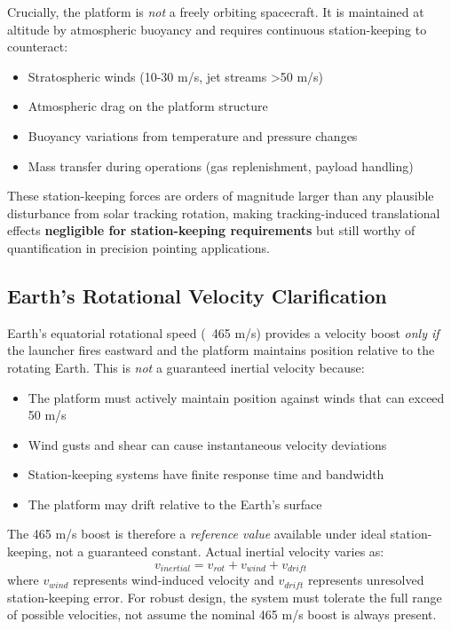 {{{{Crucially, the platform is \emph{not} a freely orbiting spacecraft. It is maintained at altitude by atmospheric buoyancy and requires continuous station-keeping to counteract:
\begin{itemize}
    \item Stratospheric winds (10-30 m/s, jet streams >50 m/s)
    \item Atmospheric drag on the platform structure
    \item Buoyancy variations from temperature and pressure changes
    \item Mass transfer during operations (gas replenishment, payload handling)
\end{itemize}
These station-keeping forces are orders of magnitude larger than any plausible disturbance from solar tracking rotation, making tracking-induced translational effects \textbf{negligible for station-keeping requirements} but still worthy of quantification in precision pointing applications.

\subsection{Earth's Rotational Velocity Clarification}
Earth's equatorial rotational speed (~465 m/s) provides a velocity boost \emph{only if} the launcher fires eastward and the platform maintains position relative to the rotating Earth. This is \emph{not} a guaranteed inertial velocity because:
\begin{itemize}
    \item The platform must actively maintain position against winds that can exceed 50 m/s
    \item Wind gusts and shear can cause instantaneous velocity deviations
    \item Station-keeping systems have finite response time and bandwidth
    \item The platform may drift relative to the Earth's surface
\end{itemize}
The 465 m/s boost is therefore a \emph{reference value} available under ideal station-keeping, not a guaranteed constant. Actual inertial velocity varies as:
\begin{equation}
v_{inertial} = v_{rot} + v_{wind} + v_{drift}
\end{equation}
where $v_{wind}$ represents wind-induced velocity and $v_{drift}$ represents unresolved station-keeping error. For robust design, the system must tolerate the full range of possible velocities, not assume the nominal 465 m/s boost is always present.

}}}}

